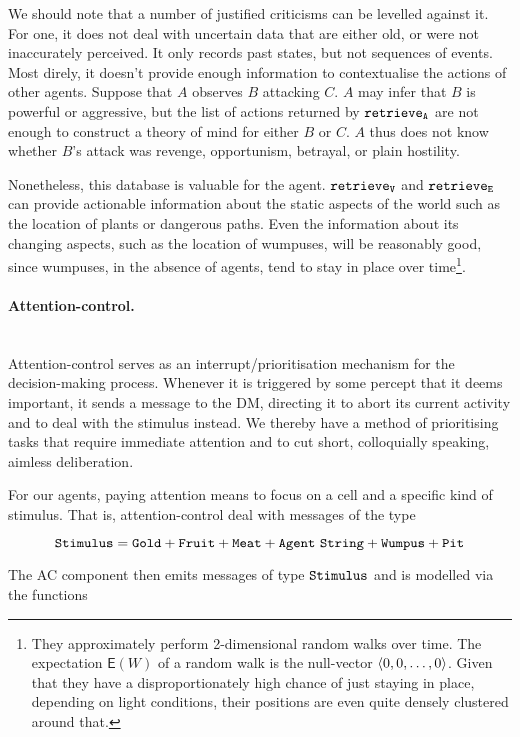 We should note that a number of justified criticisms can be levelled against it. For one, it does not deal with uncertain data that are either old, or were not inaccurately perceived. It only records past states, but not sequences of events. Most direly, it doesn't provide enough information to contextualise the actions of other agents. Suppose that $A$ observes $B$ attacking $C$. $A$ may infer that $B$ is powerful or aggressive, but the list of actions returned by $\mathtt{retrieve_A}$ are not enough to construct a theory of mind for either $B$ or $C$. $A$ thus does not know whether $B$'s attack was revenge, opportunism, betrayal, or plain hostility.

Nonetheless, this database is valuable for the agent. $\mathtt{retrieve_V}$ and $\mathtt{retrieve_E}$ can provide actionable information about the static aspects of the world such as the location of plants or dangerous paths. Even the information about its changing aspects, such as the location of wumpuses, will be reasonably good, since wumpuses, in the absence of agents, tend to stay in place over time\footnote{They approximately perform 2-dimensional random walks over time. The expectation $\mathsf{E}(W)$ of a random walk is the null-vector $\langle 0,0,\dots,0 \rangle$. Given that they have a disproportionately high chance of just staying in place, depending on light conditions, their positions are even quite densely clustered around that.}.

\paragraph{Attention-control.}\ \\

Attention-control serves as an interrupt/prioritisation mechanism for the decision-making process. Whenever it is triggered by some percept that it deems important, it sends a message to the DM, directing it to abort its current activity and to deal with the stimulus instead. We thereby have a method of prioritising tasks that require immediate attention and to cut short, colloquially speaking, aimless deliberation. 

For our agents, paying attention means to focus on a cell and a specific kind of stimulus. That is, attention-control deal with messages of the type

$$
	\mathtt{Stimulus} = \mathtt{Gold + Fruit + Meat + Agent\ String + Wumpus + Pit}
$$

The AC component then emits messages of type $\mathtt{Stimulus}$ and is modelled via the functions

